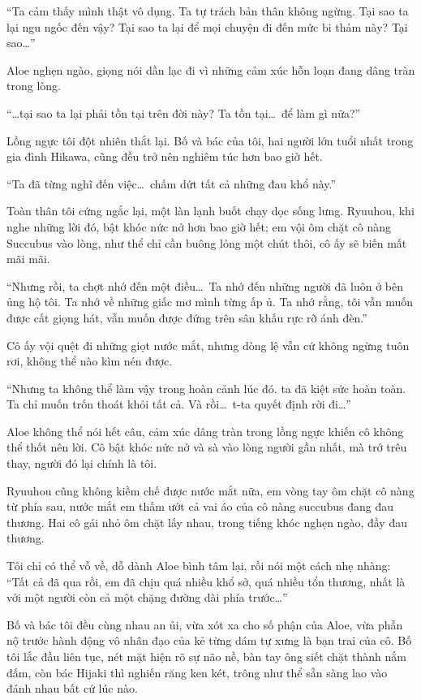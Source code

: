 \documentclass[../main.tex]{subfiles}
\begin{document}
``Ta cảm thấy mình thật vô dụng. Ta tự trách bản thân không ngừng. Tại sao ta lại ngu ngốc đến vậy? Tại sao ta lại để mọi chuyện đi đến mức bi thảm này? Tại sao\dots''

Aloe nghẹn ngào, giọng nói dần lạc đi vì những cảm xúc hỗn loạn đang dâng tràn trong lòng.

``\dots tại sao ta lại phải tồn tại trên đời này? Ta tồn tại\dots\ để làm gì nữa?''

Lồng ngực tôi đột nhiên thắt lại. Bố và bác của tôi, hai người lớn tuổi nhất trong gia đình Hikawa, cũng đều trở nên nghiêm túc hơn bao giờ hết.

``Ta đã từng nghĩ đến việc\dots\ chấm dứt tất cả những đau khổ này.''

Toàn thân tôi cứng ngắc lại, một làn lạnh buốt chạy dọc sống lưng. Ryuuhou, khi nghe những lời đó, bật khóc nức nở hơn bao giờ hết; em vội ôm chặt cô nàng Succubus vào lòng, như thể chỉ cần buông lỏng một chút thôi, cô ấy sẽ biến mất mãi mãi.

``Nhưng rồi, ta chợt nhớ đến một điều\dots\ Ta nhớ đến những người đã luôn ở bên ủng hộ tôi. Ta nhớ về những giấc mơ mình từng ấp ủ. Ta nhớ rằng, tôi vẫn muốn được cất giọng hát, vẫn muốn được đứng trên sân khấu rực rỡ ánh đèn.''

Cô ấy vội quệt đi những giọt nước mắt, nhưng dòng lệ vẫn cứ không ngừng tuôn rơi, không thể nào kìm nén được.

``Nhưng ta không thể làm vậy trong hoàn cảnh lúc đó. ta đã kiệt sức hoàn toàn. Ta chỉ muốn trốn thoát khỏi tất cả. Và rồi\dots\ t-ta quyết định rời đi\dots''

Aloe không thể nói hết câu, cảm xúc dâng tràn trong lồng ngực khiến cô không thể thốt nên lời. Cô bật khóc nức nở và sà vào lòng người gần nhất, mà trớ trêu thay, người đó lại chính là tôi.

Ryuuhou cũng không kiềm chế được nước mắt nữa, em vòng tay ôm chặt cô nàng từ phía sau, nước mắt em thấm ướt cả vai áo của cô nàng succubus đang đau thương. Hai cô gái nhỏ ôm chặt lấy nhau, trong tiếng khóc nghẹn ngào, đầy đau thương.

Tôi chỉ có thể vỗ về, dỗ dành Aloe bình tâm lại, rồi nói một cách nhẹ nhàng: ``Tất cả đã qua rồi, em đã chịu quá nhiều khổ sở, quá nhiều tổn thương, nhất là với một người còn cả một chặng đường dài phía trước\dots''

Bố và bác tôi đều cùng nhau an ủi, vừa xót xa cho số phận của Aloe, vừa phẫn nộ trước hành động vô nhân đạo của kẻ từng dám tự xưng là bạn trai của cô. Bố tôi lắc đầu liên tục, nét mặt hiện rõ sự não nề, bàn tay ông siết chặt thành nắm đấm, còn bác Hijaki thì nghiến răng ken két, trông như thể sẵn sàng lao vào đánh nhau bất cứ lúc nào.
\end{document}
